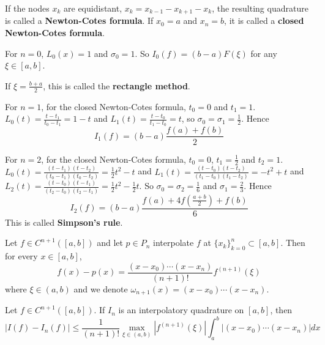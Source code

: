 \begin{definition}
	If the nodes $x_k$ are equidistant, $x_k = x_{k - 1} - x_{k + 1} - x_k$, the resulting quadrature is called a \textbf{Newton-Cotes formula}. If $x_0 = a$ and $x_n = b$, it is called a \textbf{closed Newton-Cotes formula}.
\end{definition}

\begin{example}
	For $n = 0$, $L_0(x) = 1$ and $\sigma_0 = 1$. So $I_0(f) = (b - a) F(\xi)$ for any $\xi \in [a, b]$.

	If $\xi = \frac{b + a}{2}$, this is called the \textbf{rectangle method}.
\end{example}

\begin{example}
	For $n = 1$, for the closed Newton-Cotes formula, $t_0 = 0$ and $t_1 = 1$. $L_0(t) = \frac{t - t_1}{t_0 - t_1} = 1 - t$ and $L_1(t) = \frac{t - t_0}{t_1 - t_0} = t$, so $\sigma_0 = \sigma_1 = \frac{1}{2}$. Hence
	\[
		I_1(f) = (b - a) \frac{f(a) + f(b)}{2}
	\]
\end{example}

\begin{example}
	For $n = 2$, for the closed Newton-Cotes formula, $t_0 = 0$, $t_1 = \frac{1}{2}$ and $t_2 = 1$. $L_0(t) = \frac{(t - t_1)(t - t_2)}{(t_0 - t_1)(t_0 - t_2)} = \frac{1}{2} t^2 - t$ and $L_1(t) = \frac{(t - t_0)(t - t_2)}{(t_1 - t_0)(t_1 - t_2)} = -t^2 + t$ and $L_2(t) = \frac{(t - t_0)(t - t_1)}{(t_2 - t_0)(t_2 - t_1)} = \frac{1}{2} t^2 - \frac{1}{2} t$. So $\sigma_0 = \sigma_2 = \frac{1}{6}$ and $\sigma_1 = \frac{2}{3}$. Hence
	\[
		I_2(f) = (b - a) \frac{f(a) + 4f(\frac{a + b}{2}) + f(b)}{6}
	\]
	This is called \textbf{Simpson's rule}.
\end{example}

\begin{theorem}
	Let $f \in C^{n + 1}([a, b])$ and let $p \in P_n$ interpolate $f$ at $\{ x_k \}_{k = 0}^n \subset [a, b]$. Then for every $x \in [a, b]$,
	\[
		f(x) - p(x) = \frac{(x - x_0) \cdots (x - x_n)}{(n + 1)!} f^{(n + 1)}(\xi)
	\]
	where $\xi \in (a, b)$ and we denote $\omega_{n + 1}(x) = (x - x_0) \cdots (x - x_n)$.  
\end{theorem}

\begin{theorem}
	Let $f \in C^{n + 1}([a, b])$. If $I_n$ is an interpolatory quadrature on $[a, b]$, then
	\[
		|I(f) - I_n(f)| \le \frac{1}{(n + 1)!} \max_{\xi \in (a, b)} |f^{(n + 1)}(\xi)| \int_{a}^{b} |(x - x_0) \cdots (x - x_n)| dx
	\]
\end{theorem}


